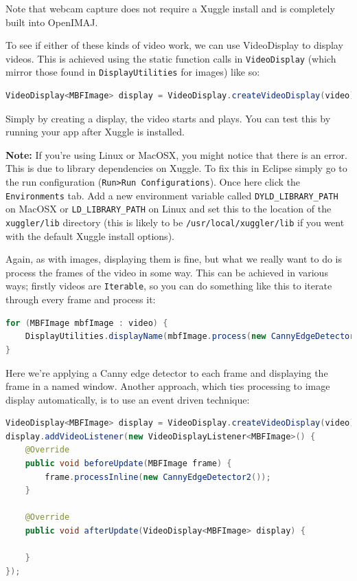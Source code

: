 \documentclass[10pt,a4paper,twoside,extrafontsizes]{memoir}
\begin{document}
Note that webcam capture does not require a Xuggle install and is completely built into OpenIMAJ.

To see if either of these kinds of video work, we can use VideoDisplay to display videos. This is 
achieved using the static function calls in \verb+VideoDisplay+ (which mirror those found in 
\verb+DisplayUtilities+ for images) like so:
\begin{lstlisting}[language=java]
VideoDisplay<MBFImage> display = VideoDisplay.createVideoDisplay(video);
\end{lstlisting}

Simply by creating a display, the video starts and plays. You can test this by running 
your app after Xuggle is installed. 

\textbf{Note:} If you're using Linux or MacOSX, you might notice that there is an error. 
This is due to library dependencies on Xuggle. To fix this in Eclipse simply go to the run configuration 
(\verb+Run>Run Configurations+). Once here click the \verb+Environments+ tab. Add a new environment 
variable called \verb+DYLD_LIBRARY_PATH+ on MacOSX or \verb+LD_LIBRARY_PATH+ on Linux and set this to 
the location of the \verb+xuggler/lib+ directory (this is likely to be \verb+/usr/local/xuggler/lib+
if you went with the default Xuggle install options).

Again, as with images, displaying them is fine, but what we really want to do is process the frames of 
the video in some way. This can be achieved in various ways; firstly videos are \verb+Iterable+, so you can 
do something like this to iterate through every frame and process it:
\begin{lstlisting}[language=java]
for (MBFImage mbfImage : video) {
    DisplayUtilities.displayName(mbfImage.process(new CannyEdgeDetector2()), "videoFrames");
}
\end{lstlisting}
Here we're applying a Canny edge detector to each frame and displaying the frame in a named window. Another 
approach, which ties processing to image display automatically, is to use an event driven technique:
\begin{lstlisting}[language=java]
VideoDisplay<MBFImage> display = VideoDisplay.createVideoDisplay(video);
display.addVideoListener(new VideoDisplayListener<MBFImage>() {
    @Override
    public void beforeUpdate(MBFImage frame) {
        frame.processInline(new CannyEdgeDetector2());
    }

    @Override
    public void afterUpdate(VideoDisplay<MBFImage> display) {

    }
});
\end{lstlisting}
\end{document}
